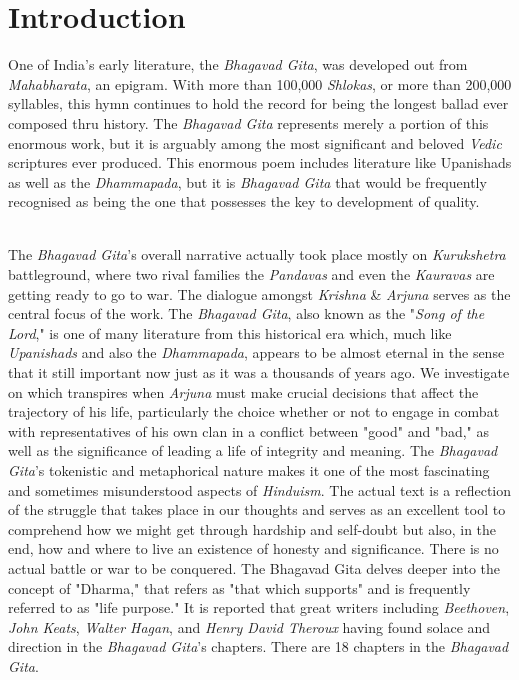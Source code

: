 \documentclass[runningheads]{llncs}
\begin{document}
\section{Introduction}\label{sec1}
One of India's early literature, the \textit{Bhagavad Gita}, was developed out from \textit{Mahabharata}, an epigram. With more than 100,000 \textit{Shlokas}, or more than 200,000 syllables, this hymn continues to hold the record for being the longest ballad ever composed thru history. The \textit{Bhagavad Gita} represents merely a portion of this enormous work, but it is arguably among the most significant and beloved \textit{Vedic} scriptures ever produced. This enormous poem includes literature like Upanishads as well as the \textit{Dhammapada}, but it is \textit{Bhagavad Gita} that would be frequently recognised as being the one that possesses the key to development of quality. \\\textbf{\\}

The \textit{Bhagavad Gita}'s overall narrative actually took place mostly on \textit{Kurukshetra} battleground, where two rival families the \textit{Pandavas} and even the \textit{Kauravas} are getting ready to go to war. The dialogue amongst \textit{Krishna} \& \textit{Arjuna} serves as the central focus of the work. The \textit{Bhagavad Gita}, also known as the "\textit{Song of the Lord}," is one of many literature from this historical era which, much like \textit{Upanishads} and also the \textit{Dhammapada}, appears to be almost eternal in the sense that it still important now just as it was a thousands of years ago. We investigate on which transpires when \textit{Arjuna} must make crucial decisions that affect the trajectory of his life, particularly the choice whether or not to engage in combat with representatives of his own clan in a conflict between "good" and "bad," as well as the significance of leading a life of integrity and meaning. The \textit{Bhagavad Gita}'s tokenistic and metaphorical nature makes it one of the most fascinating and sometimes misunderstood aspects of \textit{Hinduism}. The actual text is a reflection of the struggle that takes place in our thoughts and serves as an excellent tool to comprehend how we might get through hardship and self-doubt but also, in the end, how and where to live an existence of honesty and significance. There is no actual battle or war to be conquered. The Bhagavad Gita delves deeper into the concept of "Dharma," that refers as "that which supports" and is frequently referred to as "life purpose." It is reported that great writers including \textit{Beethoven}, \textit{John Keats}, \textit{Walter Hagan}, and \textit{Henry David Theroux} having found solace and direction in the \textit{Bhagavad Gita}'s chapters. There are 18 chapters in the \textit{Bhagavad Gita}.  \\\textbf{\\}
\end{document}
